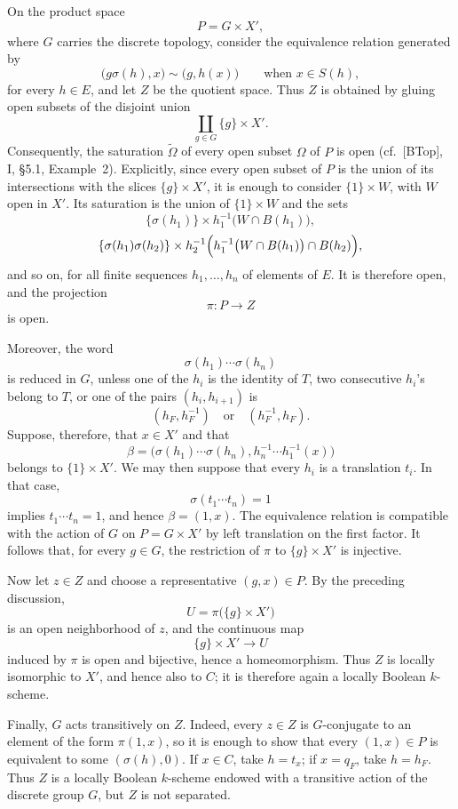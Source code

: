 On the product space
\[
  P=G\times X',
\]
where \(G\) carries the discrete topology, consider the
equivalence relation generated by
\[
  \bigl(g\sigma(h),x\bigr)\sim\bigl(g,h(x)\bigr)
  \qquad\text{when }x\in S(h),
\]
for every \(h\in E\), and let \(Z\) be the quotient space. Thus
\(Z\) is obtained by gluing open subsets of the disjoint union
\[
  \coprod_{g\in G}\{g\}\times X'.
\]
Consequently, the saturation \(\widetilde\Omega\) of every open
subset \(\Omega\) of \(P\) is open (cf.\ [BTop], I, \S5.1,
Example~2). Explicitly, since every open subset of \(P\) is the
union of its intersections with the slices
\(\{g\}\times X'\), it is enough to consider
\(\{1\}\times W\), with \(W\) open in \(X'\). Its saturation is
the union of \(\{1\}\times W\) and the sets
\[
  \{\sigma(h_1)\}\times
  h_1^{-1}\bigl(W\cap B(h_1)\bigr),
\]
\[
  \{\sigma(h_1)\sigma(h_2)\}\times
  h_2^{-1}\Bigl(
    h_1^{-1}\bigl(W\cap B(h_1)\bigr)\cap B(h_2)
  \Bigr),
\]
and so on, for all finite sequences
\(h_1,\ldots,h_n\) of elements of \(E\). It is therefore open,
and the projection
\[
  \pi:P\longrightarrow Z
\]
is open.

Moreover, the word
\[
  \sigma(h_1)\cdots\sigma(h_n)
\]
is reduced in \(G\), unless one of the \(h_i\) is the identity of
\(T\), two consecutive \(h_i\)'s belong to \(T\), or one of the
pairs \((h_i,h_{i+1})\) is
\[
  (h_F,h_F^{-1})
  \quad\text{or}\quad
  (h_F^{-1},h_F).
\]
Suppose, therefore, that \(x\in X'\) and that
\[
  \beta=
  \bigl(
    \sigma(h_1)\cdots\sigma(h_n),
    h_n^{-1}\cdots h_1^{-1}(x)
  \bigr)
\]
belongs to \(\{1\}\times X'\). We may then suppose that every
\(h_i\) is a translation \(t_i\). In that case,
\[
  \sigma(t_1\cdots t_n)=1
\]
implies \(t_1\cdots t_n=1\), and hence
\(\beta=(1,x)\). The equivalence relation is compatible with the
action of \(G\) on \(P=G\times X'\) by left translation on the
first factor. It follows that, for every \(g\in G\), the
restriction of \(\pi\) to \(\{g\}\times X'\) is injective.

Now let \(z\in Z\) and choose a representative \((g,x)\in P\).
By the preceding discussion,
\[
  U=\pi\bigl(\{g\}\times X'\bigr)
\]
is an open neighborhood of \(z\), and the continuous map
\[
  \{g\}\times X'\longrightarrow U
\]
induced by \(\pi\) is open and bijective, hence a homeomorphism.
Thus \(Z\) is locally isomorphic to \(X'\), and hence also to
\(C\); it is therefore again a locally Boolean \(k\)-scheme.

Finally, \(G\) acts transitively on \(Z\). Indeed, every \(z\in Z\)
is \(G\)-conjugate to an element of the form
\(\pi(1,x)\), so it is enough to show that every
\((1,x)\in P\) is equivalent to some \((\sigma(h),0)\). If
\(x\in C\), take \(h=t_x\); if \(x=q_F\), take \(h=h_F\). Thus
\(Z\) is a locally Boolean \(k\)-scheme endowed with a transitive
action of the discrete group \(G\), but \(Z\) is not separated.
